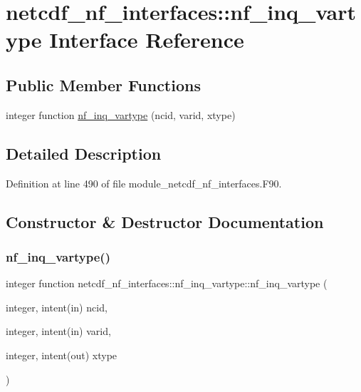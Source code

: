 \hypertarget{interfacenetcdf__nf__interfaces_1_1nf__inq__vartype}{}\section{netcdf\+\_\+nf\+\_\+interfaces\+:\+:nf\+\_\+inq\+\_\+vartype Interface Reference}
\label{interfacenetcdf__nf__interfaces_1_1nf__inq__vartype}
\subsection*{Public Member Functions}
\begin{DoxyCompactItemize}
\item 
integer function \hyperlink{interfacenetcdf__nf__interfaces_1_1nf__inq__vartype_a3d1a6efa962463d0e355537303c348fe}{nf\+\_\+inq\+\_\+vartype} (ncid, varid, xtype)
\end{DoxyCompactItemize}


\subsection{Detailed Description}


Definition at line 490 of file module\+\_\+netcdf\+\_\+nf\+\_\+interfaces.\+F90.



\subsection{Constructor \& Destructor Documentation}
\mbox{\label{interfacenetcdf__nf__interfaces_1_1nf__inq__vartype_a3d1a6efa962463d0e355537303c348fe}} 
\subsubsection{\texorpdfstring{nf\+\_\+inq\+\_\+vartype()}{nf\_inq\_vartype()}}
{\footnotesize\ttfamily integer function netcdf\+\_\+nf\+\_\+interfaces\+::nf\+\_\+inq\+\_\+vartype\+::nf\+\_\+inq\+\_\+vartype (\begin{DoxyParamCaption}\item[{integer, intent(in)}]{ncid,  }\item[{integer, intent(in)}]{varid,  }\item[{integer, intent(out)}]{xtype }\end{DoxyParamCaption})}




